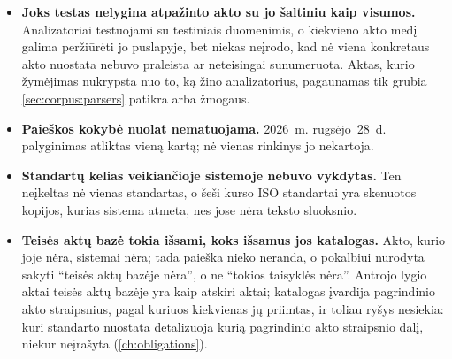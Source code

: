 \begin{itemize}
  \item \textbf{Joks testas nelygina atpažinto akto su jo šaltiniu kaip visumos.}
    Analizatoriai testuojami su testiniais duomenimis, o kiekvieno akto medį galima peržiūrėti
    jo puslapyje, bet niekas neįrodo, kad nė viena konkretaus akto nuostata nebuvo praleista ar
    neteisingai sunumeruota. Aktas, kurio žymėjimas nukrypsta nuo to, ką žino analizatorius,
    pagaunamas tik grubia \cref{sec:corpus:parsers} patikra arba žmogaus.
  \item \textbf{Paieškos kokybė nuolat nematuojama.} 2026~m. rugsėjo~28~d. palyginimas atliktas
    vieną kartą; nė vienas  rinkinys jo nekartoja.
  \item \textbf{Standartų kelias veikiančioje sistemoje nebuvo vykdytas.} Ten neįkeltas nė
    vienas standartas, o šeši kurso ISO standartai yra skenuotos kopijos, kurias sistema
    atmeta, nes jose nėra teksto sluoksnio.
  \item \textbf{Teisės aktų bazė tokia išsami, koks išsamus jos katalogas.} Akto, kurio joje
    nėra, sistemai nėra; tada paieška nieko neranda, o pokalbiui nurodyta sakyti \enquote{teisės
    aktų bazėje nėra}, o ne \enquote{tokios taisyklės nėra}. Antrojo lygio aktai teisės aktų
    bazėje yra kaip atskiri aktai; katalogas įvardija pagrindinio akto straipsnius, pagal
    kuriuos kiekvienas jų priimtas, ir toliau ryšys nesiekia: kuri standarto nuostata
    detalizuoja kurią pagrindinio akto straipsnio dalį, niekur neįrašyta (\cref{ch:obligations}).
\end{itemize}
